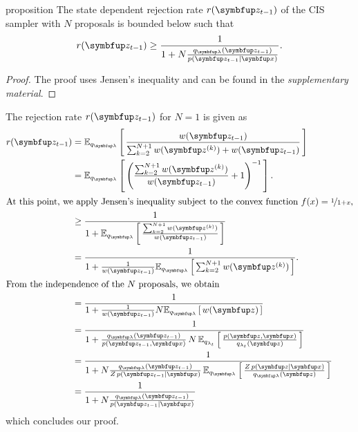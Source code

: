 
\begin{theoremEnd}{proposition}\label{thm:rej_bound}
  The state dependent rejection rate \(r(\vz_{t-1})\) of the CIS sampler with \(N\) proposals is bounded below such that
  \[
  r(\vz_{t-1}) \geq \frac{1}{1 + N\frac{q_{\vlambda}(\vz_{t-1})}{p(\vz_{t-1}\mid\vx)}}.
  \]
\end{theoremEnd}
\begin{proof}
  The proof uses Jensen's inequality and can be found in the \textit{supplementary material}.
\end{proof}
\begin{proofEnd}
  The rejection rate \(r(\vz_{t-1})\) for \(N=1\) is given as
  \begin{align}
    r(\vz_{t-1})
    &= \Esub{q_{\vlambda}}{ \frac{w(\vz_{t-1})}{ \sum^{N+1}_{k=2} w(\vz^{(k)}) + w(\vz_{t-1})} } \\
    &= \Esub{q_{\vlambda}}{ {\left( \frac{\sum^{N+1}_{k=2} w(\vz^{(k)}) }{ w(\vz_{t-1}) } + 1 \right)}^{-1} }.  \\
\intertext{At this point, we apply Jensen's inequality subject to the convex function \(f(x) = \nicefrac{1}{1 + x}\),}
    &\geq \frac{1}{1 + \Esub{q_{\vlambda}}{ \frac{\sum^{N+1}_{k=2} w(\vz^{(k)})}{w(\vz_{t-1})} } } \\
    &=    \frac{1}{1 + \frac{1}{w(\vz_{t-1})} \Esub{q_{\vlambda}}{ \sum^{N+1}_{k=2} w(\vz^{(k)}) } }. \\
\intertext{From the independence of the \(N\) proposals, we obtain}
    &=    \frac{1}{1 + \frac{1}{w(\vz_{t-1})} N \Esub{q_{\vlambda}}{ w(\vz) } } \\
    &=    \frac{1}{1 + \frac{q_{\vlambda}(\vz_{t-1})}{p(\vz_{t-1},\vx)}\,N\,\Esub{q_{\lambda_t}}{ \frac{p(\vz, \vx) }{q_{\lambda_t}(\vz)} } } \\
    &=    \frac{1}{1 + N \frac{q_{\vlambda}(\vz_{t-1})}{Z\,p(\vz_{t-1}\mid\vx)}\,\Esub{q_{\vlambda}}{ \frac{Z\,p(\vz\mid\vx) }{q_{\vlambda}(\vz)} } } \\
    &=    \frac{1}{1 + N \frac{q_{\vlambda}(\vz_{t-1})}{p(\vz_{t-1}\mid\vx)} } \\
  \end{align}
  which concludes our proof.
\end{proofEnd}

